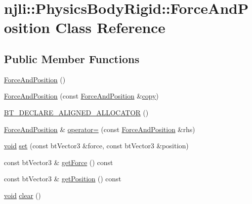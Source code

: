 \hypertarget{classnjli_1_1_physics_body_rigid_1_1_force_and_position}{}\section{njli\+:\+:Physics\+Body\+Rigid\+:\+:Force\+And\+Position Class Reference}
\label{classnjli_1_1_physics_body_rigid_1_1_force_and_position}
\subsection*{Public Member Functions}
\begin{DoxyCompactItemize}
\item 
\mbox{\hyperlink{classnjli_1_1_physics_body_rigid_1_1_force_and_position_a0e6c3f8b0e79eec391ee40f77539c224}{Force\+And\+Position}} ()
\item 
\mbox{\hyperlink{classnjli_1_1_physics_body_rigid_1_1_force_and_position_a793f0d8c9d6512fcedaa0f158717cfec}{Force\+And\+Position}} (const \mbox{\hyperlink{classnjli_1_1_physics_body_rigid_1_1_force_and_position}{Force\+And\+Position}} \&\mbox{\hyperlink{classnjli_1_1_physics_body_rigid_a7e1f73eba8cbf9860638b600f292eaee}{copy}})
\item 
\mbox{\hyperlink{classnjli_1_1_physics_body_rigid_1_1_force_and_position_a20e9a97be39f77a2c7d3fa0b9f043a48}{B\+T\+\_\+\+D\+E\+C\+L\+A\+R\+E\+\_\+\+A\+L\+I\+G\+N\+E\+D\+\_\+\+A\+L\+L\+O\+C\+A\+T\+OR}} ()
\item 
\mbox{\hyperlink{classnjli_1_1_physics_body_rigid_1_1_force_and_position}{Force\+And\+Position}} \& \mbox{\hyperlink{classnjli_1_1_physics_body_rigid_1_1_force_and_position_aa85e1766065d16c91b6e6797ca10323c}{operator=}} (const \mbox{\hyperlink{classnjli_1_1_physics_body_rigid_1_1_force_and_position}{Force\+And\+Position}} \&rhs)
\item 
\mbox{\hyperlink{_thread_8h_af1e856da2e658414cb2456cb6f7ebc66}{void}} \mbox{\hyperlink{classnjli_1_1_physics_body_rigid_1_1_force_and_position_a20fc1791d7e8865b2a37b500ec664ab3}{set}} (const bt\+Vector3 \&force, const bt\+Vector3 \&position)
\item 
const bt\+Vector3 \& \mbox{\hyperlink{classnjli_1_1_physics_body_rigid_1_1_force_and_position_ad56a83fd380b91aebfb7de95619a8a52}{get\+Force}} () const
\item 
const bt\+Vector3 \& \mbox{\hyperlink{classnjli_1_1_physics_body_rigid_1_1_force_and_position_a3d0d29d55b0246e4c450cebc47b43fbf}{get\+Position}} () const
\item 
\mbox{\hyperlink{_thread_8h_af1e856da2e658414cb2456cb6f7ebc66}{void}} \mbox{\hyperlink{classnjli_1_1_physics_body_rigid_1_1_force_and_position_acfd0c44e0b6bd6cefadf5ebc47edfe5e}{clear}} ()
\end{DoxyCompactItemize}
